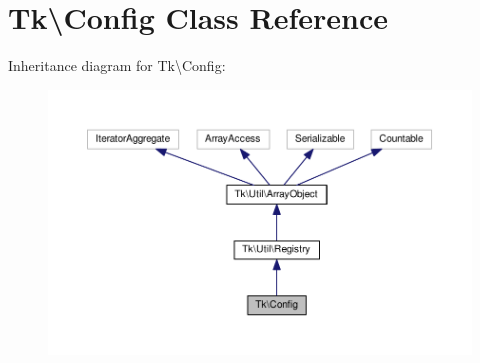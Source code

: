 \hypertarget{classTk_1_1Config}{\section{Tk\textbackslash{}Config Class Reference}
\label{classTk_1_1Config}
}


Inheritance diagram for Tk\textbackslash{}Config\+:\nopagebreak
\begin{figure}[H]
\begin{center}
\leavevmode
\includegraphics[width=350pt]{classTk_1_1Config__inherit__graph}
\end{center}
\end{figure}
